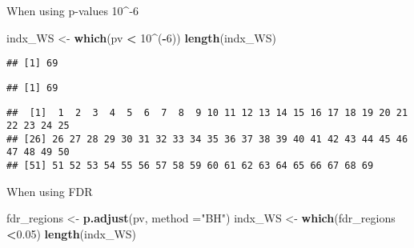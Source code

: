 \documentclass[
]{article}
\newenvironment{Shaded}{\begin{snugshade}}{\end{snugshade}}
\newcommand{\DataTypeTok}[1]{\textcolor[rgb]{0.13,0.29,0.53}{#1}}
\newcommand{\DecValTok}[1]{\textcolor[rgb]{0.00,0.00,0.81}{#1}}
\newcommand{\FloatTok}[1]{\textcolor[rgb]{0.00,0.00,0.81}{#1}}
\newcommand{\KeywordTok}[1]{\textcolor[rgb]{0.13,0.29,0.53}{\textbf{#1}}}
\newcommand{\NormalTok}[1]{#1}
\newcommand{\OperatorTok}[1]{\textcolor[rgb]{0.81,0.36,0.00}{\textbf{#1}}}
\newcommand{\StringTok}[1]{\textcolor[rgb]{0.31,0.60,0.02}{#1}}
\begin{document}
When using p-values 10\^{}-6

\begin{Shaded}
\begin{Highlighting}[]
\NormalTok{indx_WS <-}\StringTok{  }\KeywordTok{which}\NormalTok{(pv }\OperatorTok{<}\StringTok{ }\DecValTok{10}\OperatorTok{^}\NormalTok{(}\OperatorTok{-}\DecValTok{6}\NormalTok{))}
\KeywordTok{length}\NormalTok{(indx_WS)}
\end{Highlighting}
\end{Shaded}

\begin{verbatim}
## [1] 69
\end{verbatim}

\begin{Shaded}
\end{Shaded}

\begin{verbatim}
## [1] 69
\end{verbatim}

\begin{Shaded}
\end{Shaded}

\begin{verbatim}
##  [1]  1  2  3  4  5  6  7  8  9 10 11 12 13 14 15 16 17 18 19 20 21 22 23 24 25
## [26] 26 27 28 29 30 31 32 33 34 35 36 37 38 39 40 41 42 43 44 45 46 47 48 49 50
## [51] 51 52 53 54 55 56 57 58 59 60 61 62 63 64 65 66 67 68 69
\end{verbatim}

When using FDR

\begin{Shaded}
\begin{Highlighting}[]
\NormalTok{fdr_regions <-}\StringTok{ }\KeywordTok{p.adjust}\NormalTok{(pv, }\DataTypeTok{method =}\StringTok{"BH"}\NormalTok{)}
\NormalTok{indx_WS <-}\StringTok{  }\KeywordTok{which}\NormalTok{(fdr_regions  }\OperatorTok{<}\FloatTok{0.05}\NormalTok{)}
\KeywordTok{length}\NormalTok{(indx_WS)}
\end{Highlighting}
\end{Shaded}
\end{document}
